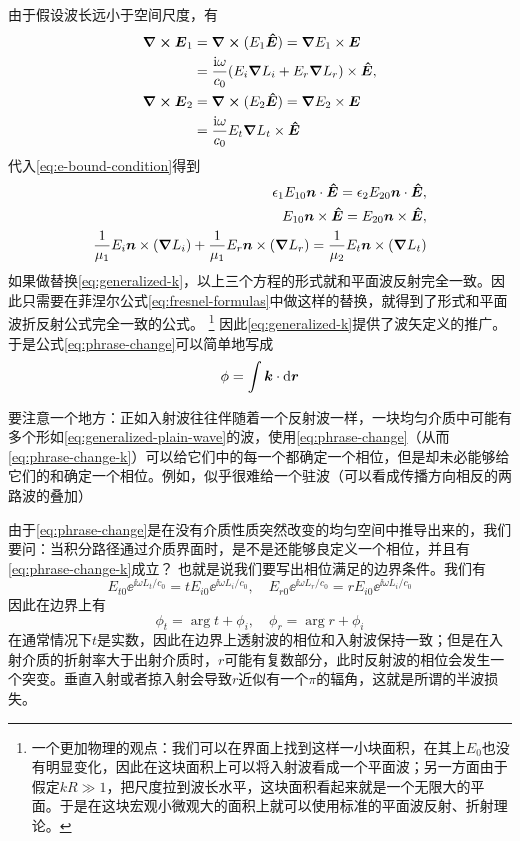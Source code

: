 由于假设波长远小于空间尺度，有
\[
    \begin{aligned}
        \curl{\vb*{E}_1} &= \curl{(E_1 \vu*{E})} = \grad{E_1} \times \vb*{E} \\
        &= \frac{\mathrm{i} \omega}{c_0} (E_{i} \grad{L_i} + E_{r} \grad{L_r}) \times \vu*{E}, \\
        \curl{\vb*{E}_2} &= \curl{(E_2 \vu*{E})} = \grad{E_2} \times \vb*{E} \\
        &= \frac{\mathrm{i} \omega}{c_0} E_{t} \grad{L_t} \times \vu*{E}
    \end{aligned}
\]
代入\eqref{eq:e-bound-condition}得到
\[
    \begin{aligned}
        \epsilon_1 E_{10} \vb*{n} \cdot \vu*{E} = \epsilon_2 E_{20} \vb*{n} \cdot \vu*{E}, \\
        E_{10} \vb*{n} \times \vu*{E} = E_{20} \vb*{n} \times \vu*{E}, \\
        \frac{1}{\mu_1} E_i \vb*{n} \times (\grad{L_i}) + \frac{1}{\mu_1} E_r \vb*{n} \times (\grad{L_r}) = \frac{1}{\mu_2} E_t \vb*{n} \times (\grad{L_t})
    \end{aligned}
\]
如果做替换\eqref{eq:generalized-k}，以上三个方程的形式就和平面波反射完全一致。因此只需要在菲涅尔公式\eqref{eq:fresnel-formulas}中做这样的替换，就得到了形式和平面波折反射公式完全一致的公式。%
\footnote{一个更加物理的观点：我们可以在界面上找到这样一小块面积，在其上$E_0$也没有明显变化，因此在这块面积上可以将入射波看成一个平面波；另一方面由于假定$kR \gg 1$，把尺度拉到波长水平，这块面积看起来就是一个无限大的平面。于是在这块宏观小微观大的面积上就可以使用标准的平面波反射、折射理论。}
因此\eqref{eq:generalized-k}提供了波矢定义的推广。
于是公式\eqref{eq:phrase-change}可以简单地写成
\begin{equation}
    \phi = \int \vb*{k} \cdot \dd{\vb*{r}}
    \label{eq:phrase-change-k}
\end{equation}

要注意一个地方：正如入射波往往伴随着一个反射波一样，一块均匀介质中可能有多个形如\eqref{eq:generalized-plain-wave}的波，使用\eqref{eq:phrase-change}（从而\eqref{eq:phrase-change-k}）可以给它们中的每一个都确定一个相位，但是却未必能够给它们的和确定一个相位。例如，似乎很难给一个驻波（可以看成传播方向相反的两路波的叠加）

由于\eqref{eq:phrase-change}是在没有介质性质突然改变的均匀空间中推导出来的，我们要问：当积分路径通过介质界面时，是不是还能够良定义一个相位，并且有\eqref{eq:phrase-change-k}成立？
也就是说我们要写出相位满足的边界条件。我们有
\[
    E_{t0} \ee^{\ii \omega L_t / c_0} = t E_{i0} \ee^{\ii \omega L_i / c_0}, \quad E_{r0} \ee^{\ii \omega L_r / c_0} = r E_{i0} \ee^{\ii \omega L_i / c_0}
\]
因此在边界上有
\begin{equation}
    \phi_t = \arg t + \phi_i, \quad \phi_r = \arg r + \phi_i
    \label{eq:phrase-on-surface}
\end{equation}
在通常情况下$t$是实数，因此在边界上透射波的相位和入射波保持一致；但是在入射介质的折射率大于出射介质时，$r$可能有复数部分，此时反射波的相位会发生一个突变。垂直入射或者掠入射会导致$r$近似有一个$\pi$的辐角，这就是所谓的半波损失。

